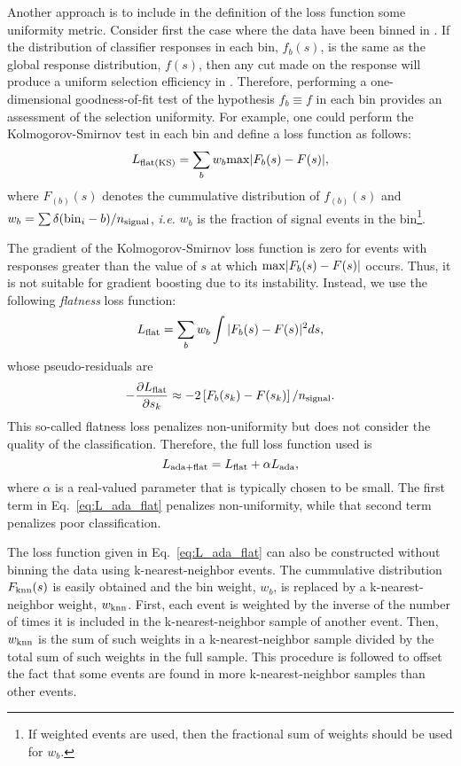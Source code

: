 Another approach is to include in the definition of the loss function some uniformity metric.  Consider first the case where the data have been binned in \y.  If the distribution of classifier responses in each bin, $f_b(s)$, is the same as the global response distribution, $f(s)$, then any cut made on the response will produce a uniform selection efficiency in \y.  Therefore, performing a one-dimensional goodness-of-fit test of the hypothesis $f_b \equiv f$ in each bin provides an assessment of the selection uniformity.  
For example, one could perform the Kolmogorov-Smirnov test in each bin and define a loss function as follows:
\begin{equation}
  L_{\rm flat(KS)} = \sum\limits_{b} w_b {\rm max}|F_b(s)-F(s)|,
\end{equation}
where $F_{(b)}(s)$ denotes the cummulative distribution of $f_{(b)}(s)$ and $w_b = \sum \delta({\rm bin}_i - b)/n_{\rm signal}$, {\em i.e.} $w_b$ is the fraction of signal events in the bin\footnote{If weighted events are used, then the fractional sum of weights should be used for $w_b$.}.   

The gradient of the Kolmogorov-Smirnov loss function is zero for events with responses greater than the value of $s$ at which ${\rm max}|F_b(s)-F(s)|$ occurs.  Thus, it is not suitable for gradient boosting due to its instability.  Instead, we use the following {\em flatness} loss function:
\begin{equation}
  L_{\rm flat} = \sum\limits_{b} w_b \int |F_b(s)-F(s)|^2 ds,
\end{equation}
whose pseudo-residuals are
\begin{equation}
 -\frac{\partial L_{\rm flat}}{\partial s_k} \approx - 2\left[F_b(s_k)-F(s_k)\right]/n_{\rm signal}.
\end{equation}
This so-called flatness loss penalizes non-uniformity but does not consider the quality of the classification.  Therefore, the full loss function used is 
\begin{equation}
\label{eq:L_ada_flat}
  L_{{\rm ada}+{\rm flat}} = L_{\rm flat} + \alpha L_{\rm ada},
\end{equation}  
where $\alpha$ is a real-valued parameter that is typically chosen to be small.  The first term in Eq.~\ref{eq:L_ada_flat} penalizes non-uniformity, while that second term penalizes poor classification.  

The loss function given in Eq.~\ref{eq:L_ada_flat} can also be constructed without binning the data using k-nearest-neighbor events.  The cummulative distribution $F_{\rm knn}(s)$ is easily obtained and the bin weight, $w_b$, is replaced by a k-nearest-neighbor weight, $w_{\rm knn}$.  First, each event is weighted by the inverse of the number of times it is included in the k-nearest-neighbor sample of another event.  Then, $w_{\rm knn}$ is the sum of such weights in a k-nearest-neighbor sample divided by the total sum of such weights in the full sample.   This procedure is followed to offset the fact that some events are found in more k-nearest-neighbor samples than other events.  

